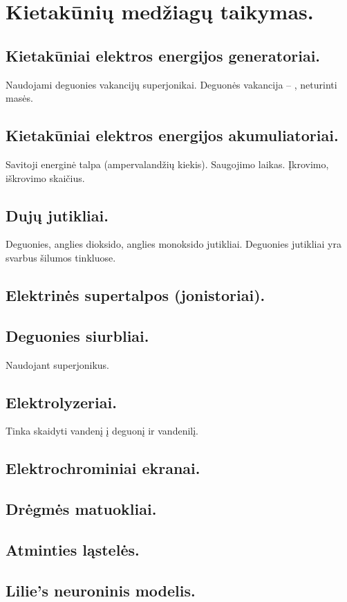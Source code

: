 \chapter{Kietakūnių medžiagų taikymas.}
\section{Kietakūniai elektros energijos generatoriai.}
Naudojami deguonies vakancijų superjonikai. Deguonės vakancija – , neturinti
masės.
\section{Kietakūniai elektros energijos akumuliatoriai.}
Savitoji energinė talpa (ampervalandžių kiekis). Saugojimo laikas.
Įkrovimo, iškrovimo skaičius.
\section{Dujų jutikliai.}
Deguonies, anglies dioksido, anglies monoksido jutikliai. Deguonies
jutikliai yra svarbus šilumos tinkluose.
\section{Elektrinės supertalpos (jonistoriai).}

\section{Deguonies siurbliai.}
Naudojant superjonikus.
\section{Elektrolyzeriai.}
Tinka skaidyti vandenį į deguonį ir vandenilį.
\section{Elektrochrominiai ekranai.}
\section{Drėgmės matuokliai.}

\section{Atminties ląstelės.}
\section{Lilie's neuroninis modelis.}
